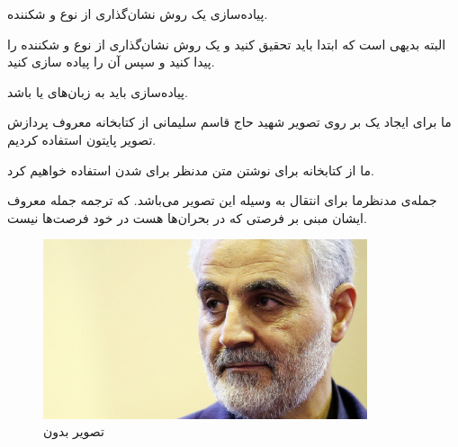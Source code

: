 \begin{boxD}
پیاده‌سازی یک روش نشان‌گذاری از نوع
و شکننده.

البته بدیهی است که ابتدا باید تحقیق 
کنید و یک روش نشان‌گذاری از نوع 
و شکننده را پیدا کنید و سپس آن را پیاده سازی کنید.

پیاده‌سازی باید به زبان‌های 
یا 
باشد.‫‪
‬‬
\end{boxD}

\begin{boxA}
ما برای ایجاد یک 
بر روی تصویر شهید حاج قاسم سلیمانی 
از کتابخانه معروف پردازش تصویر پایتون استفاده کردیم.

ما از کتابخانه
برای نوشتن متن مدنظر برای 
شدن استفاده خواهیم کرد.


جمله‌ی مدنظرما برای انتقال به وسیله این تصویر
\newline
{}
        \newline
{} 
        \newline
{}
        \newline 
{}
می‌باشد.
\newline
که ترجمه جمله معروف ایشان مبنی بر فرصتی که در بحران‌ها هست در خود فرصت‌ها نیست.
\end{boxA}


\begin{figure}[h]
    \centering
    \includegraphics[width=0.85\textwidth]{security_images/sardar2.jpg}
    \caption{تصویر بدون
    }
\end{figure}


